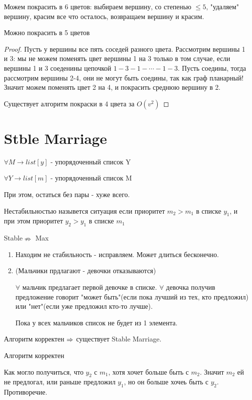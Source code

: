 Можем покрасить в 6 цветов: выбираем вершину, со степенью $\le 5$, "удаляем" вершину, красим все что осталось, возвращаем вершину и красим.
\begin{theorem}{Можно покрасить в 5 цветов}
\end{theorem}
\begin{proof}
Пусть у вершины все пять соседей разного цвета. Рассмотрим вершины 1 и 3: мы не можем поменять цвет вершины 1 на 3 только в том случае, если вершины 1 и 3 соеденины цепочкой $1-3-1-\cdots-1-3$. Пусть соедины, тогда рассмотрим вершины 2-4, они не могут быть соедины, так как граф планарный! Значит можем поменять цвет 2 на 4, и покрасить среднюю вершину в 2.

Существует алгоритм покраски в 4 цвета за $O(v^2)$
\end{proof}

\section{Stble Marriage}


$\forall M \to list[y]$ - упорядоченный список Y

$\forall Y \to list[m]$ - упорядоченный список M

При этом, остаться без пары - хуже всего.



\begin{Def}
Нестабильностью назывется ситуация если приоритет $m_2 > m_1$ в списке $y_1$, и при этом приоритет $y_2 > y_1$ в списке $m_1$
\end{Def}

\begin{Rem}
Stable$\nRightarrow$ Max
\end{Rem}

\begin{enumerate} 
\item
Находим не стабильность - исправляем. Может длиться бесконечно.

\item
(Мальчики прдлагают - девочки отказываются)

$\forall$ мальчик предлагает первой девочке в списке.
$\forall$ девочка получив предложение говорит "может быть"(если пока лучший из тех, кто предложил) или "нет"(если уже предложил кто-то лучше). 

Пока у всех мальчиков список не будет из 1 элемента.
\end{enumerate}

\begin{Rem}
Алгоритм корректен $\Rightarrow$ существует Stable Marriage.
\end{Rem}

\begin{theorem}{Алгоритм корректен}


Как могло получиться, что $y_2$ с $m_1$, хотя хочет больше быть с $m_2$. Значит $m_2$ ей не предлогал, или раньше предложил $y_1$, но он больше хочеь быть с $y_2$. Противоречие.
\end{theorem}